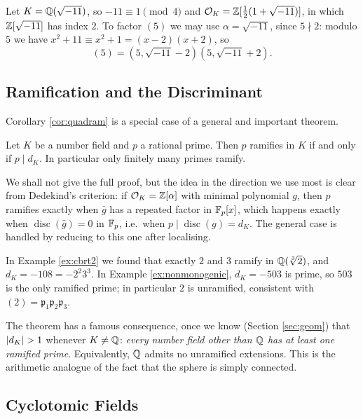 \documentclass[a4paper]{scrartcl}
\renewcommand{\OO}{\mathcal{O}}
\newcommand{\disc}{\operatorname{disc}}
\newcommand{\fp}{\mathfrak{p}}
\begin{document}
\begin{example}
	Let $K = \mathbb{Q}(\sqrt{-11})$, so $-11 \equiv 1 \pmod 4$ and $\OO_K = \Z[\tfrac12(1+\sqrt{-11})]$, in which $\mathbb{Z}[\sqrt{-11}]$ has index $2$. To factor $(5)$ we may use $\alpha = \sqrt{-11}$, since $5 \nmid 2$: modulo $5$ we have $x^2+11 \equiv x^2+1 = (x-2)(x+2)$, so
	$$(5) = \left(5, \sqrt{-11}-2\right)\left(5,\sqrt{-11}+2\right).$$
\end{example}

\subsection{Ramification and the Discriminant}

Corollary \ref{cor:quadram} is a special case of a general and important theorem.

\begin{theorem}\label{thm:ramdisc}
	Let $K$ be a number field and $p$ a rational prime. Then $p$ ramifies in $K$ if and only if $p \mid d_K$. In particular only finitely many primes ramify.
\end{theorem}

We shall not give the full proof, but the idea in the direction we use most is clear from Dedekind's criterion: if $\OO_K = \Z[\alpha]$ with minimal polynomial $g$, then $p$ ramifies exactly when $\bar g$ has a repeated factor in $\mathbb{F}_p[x]$, which happens exactly when $\disc(\bar g) = 0$ in $\mathbb{F}_p$, i.e.\ when $p \mid \disc(g) = d_K$. The general case is handled by reducing to this one after localising.

\begin{example}
	In Example \ref{ex:cbrt2} we found that exactly $2$ and $3$ ramify in $\mathbb{Q}(\sqrt[3]2)$, and $d_K = -108 = -2^2 3^3$. In Example \ref{ex:nonmonogenic}, $d_K = -503$ is prime, so $503$ is the only ramified prime; in particular $2$ is unramified, consistent with $(2) = \fp_1\fp_2\fp_3$.
\end{example}

The theorem has a famous consequence, once we know (Section \ref{sec:geom}) that $\lvert d_K\rvert > 1$ whenever $K \neq \mathbb{Q}$: \emph{every number field other than $\mathbb{Q}$ has at least one ramified prime}. Equivalently, $\mathbb{Q}$ admits no unramified extensions. This is the arithmetic analogue of the fact that the sphere is simply connected.

\subsection{Cyclotomic Fields}\label{sec:cyclo}
\end{document}
